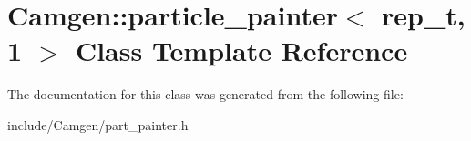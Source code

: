 \hypertarget{a00399}{\section{Camgen\-:\-:particle\-\_\-painter$<$ rep\-\_\-t, 1 $>$ Class Template Reference}
\label{a00399}
}


The documentation for this class was generated from the following file\-:\begin{DoxyCompactItemize}
\item 
include/\-Camgen/part\-\_\-painter.\-h\end{DoxyCompactItemize}
